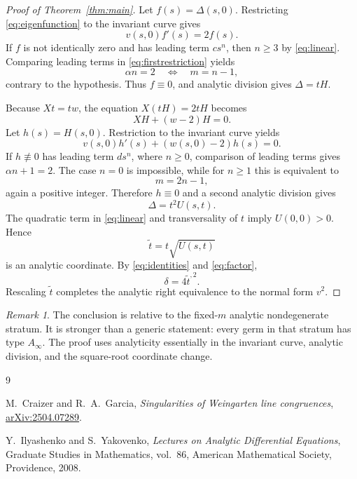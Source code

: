 \documentclass[11pt]{article}
\theoremstyle{remark}
\newtheorem{remark}[theorem]{Remark}
\begin{document}
\begin{proof}[Proof of Theorem~\ref{thm:main}]
Let $f(s)=\Delta(s,0)$.  Restricting \eqref{eq:eigenfunction} to the
invariant curve gives
\begin{equation}\label{eq:firstrestriction}
 v(s,0)f'(s)=2f(s).
\end{equation}
If $f$ is not identically zero and has leading term $cs^n$, then
$n\ge3$ by \eqref{eq:linear}.  Comparing leading terms in
\eqref{eq:firstrestriction} yields
\[
 \alpha n=2
 \quad\Longleftrightarrow\quad
 m=n-1,
\]
contrary to the hypothesis.  Thus $f\equiv0$, and analytic division gives
$\Delta=tH$.

Because $Xt=tw$, the equation $X(tH)=2tH$ becomes
\[
 XH+(w-2)H=0.
\]
Let $h(s)=H(s,0)$.  Restriction to the invariant curve yields
\begin{equation}\label{eq:secondrestriction}
 v(s,0)h'(s)+(w(s,0)-2)h(s)=0.
\end{equation}
If $h\not\equiv0$ has leading term $ds^n$, where $n\ge0$, comparison of
leading terms gives $\alpha n+1=2$.  The case $n=0$ is impossible, while
for $n\ge1$ this is equivalent to
\[
 m=2n-1,
\]
again a positive integer.  Therefore $h\equiv0$ and a second analytic
division gives
\begin{equation}\label{eq:factor}
 \Delta=t^2U(s,t).
\end{equation}
The quadratic term in \eqref{eq:linear} and transversality of $t$ imply
$U(0,0)>0$.  Hence
\[
 \widetilde t=t\sqrt{U(s,t)}
\]
is an analytic coordinate.  By \eqref{eq:identities} and
\eqref{eq:factor},
\[
 \delta=4\widetilde t^{,2}.
\]
Rescaling $\widetilde t$ completes the analytic right equivalence to the
normal form $v^2$.
\end{proof}

\begin{remark}
The conclusion is relative to the fixed-$m$ analytic nondegenerate stratum.
It is stronger than a generic statement: every germ in that stratum has
type $A_\infty$.  The proof uses analyticity essentially in the invariant
curve, analytic division, and the square-root coordinate change.
\end{remark}

\begin{thebibliography}{9}

M.~Craizer and R.~A.~Garcia,
\emph{Singularities of Weingarten line congruences},
\href{https://arxiv.org/abs/2504.07289}{arXiv:2504.07289}.

Y.~Ilyashenko and S.~Yakovenko,
\emph{Lectures on Analytic Differential Equations},
Graduate Studies in Mathematics, vol.~86,
American Mathematical Society, Providence, 2008.

\end{thebibliography}
\end{document}
